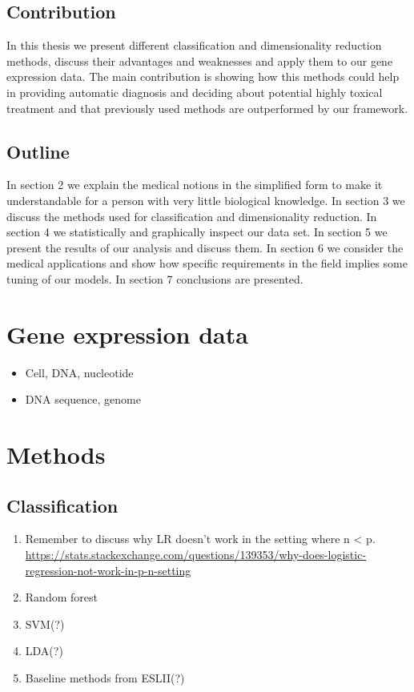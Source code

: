 \documentclass[12pt, wide]{mwart}
\begin{document}
\subsection{Contribution}

In this thesis we present different classification and dimensionality reduction methods, discuss their advantages and weaknesses and apply them to our gene expression data. The main contribution is showing how this methods could help in providing automatic diagnosis and deciding about potential highly toxical treatment and that previously used methods are outperformed by our framework.   

\subsection{Outline}
In section 2 we explain the medical notions in the simplified form to make it understandable for a person with very little biological knowledge. In section 3 we discuss the methods used for classification and dimensionality reduction. In section 4 we statistically and graphically inspect our data set. In section 5 we present the results of our analysis and discuss them. In section 6 we consider the medical applications and show how specific requirements in the field implies some tuning of our models. In section 7 conclusions are presented.

\noindent

\section{Gene expression data}

\begin{itemize}
    \item Cell, DNA, nucleotide
    \item DNA sequence, genome
\end{itemize}

\section{Methods}

\subsection{Classification}

\begin{enumerate}
    \item Remember to discuss why LR doesn't work in the setting where n < p. \url{https://stats.stackexchange.com/questions/139353/why-does-logistic-regression-not-work-in-p-n-setting}
    \item Random forest
    \item SVM(?)
    \item LDA(?)
    \item Baseline methods from ESLII(?)
\end{enumerate}
\end{document}

